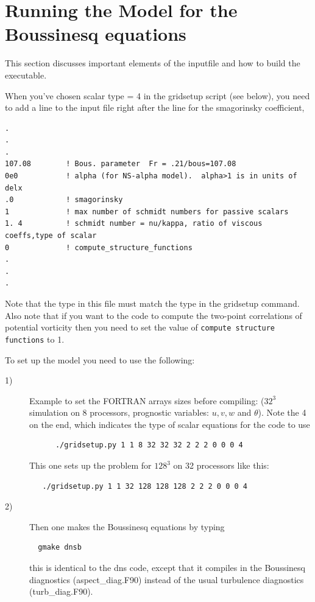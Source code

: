 \documentclass[12pt]{article}
\begin{document}
\section{Running the Model for the Boussinesq equations}

\noindent
This section discusses important elements of the inputfile and how to
build the executable.

When you've chosen scalar type = 4 in the gridsetup script (see
below), you need to add a line to the input file right after the line
for the smagorinsky coefficient,
\noindent
\begin{verbatim}
.
.
.
107.08        ! Bous. parameter  Fr = .21/bous=107.08
0e0           ! alpha (for NS-alpha model).  alpha>1 is in units of delx
.0            ! smagorinsky
1             ! max number of schmidt numbers for passive scalars
1. 4          ! schmidt number = nu/kappa, ratio of viscous coeffs,type of scalar
0             ! compute_structure_functions
.
.
. 
\end{verbatim}


Note that the type in this file must match the type in the gridsetup
command. Also note that if you want to the code to compute the
two-point correlations of potential vorticity then you need to set the
value of \texttt{compute structure functions} to 1.

\noindent
To set up the model you need to use the following:

\begin{description}
  
\item[1)] Example to set the FORTRAN arrays sizes before compiling:
  ($32^3$ simulation on 8 processors, prognostic variables: $u,v,w$
  and $\theta$). Note the 4 on the end, which
  indicates the type of scalar equations for the code to use \\
 
  \begin{verbatim}
      ./gridsetup.py 1 1 8 32 32 32 2 2 2 0 0 0 4
  \end{verbatim}

  \noindent
  This one sets up the problem for $128^3$ on 32 processors
  like this:

  \begin{verbatim}
   ./gridsetup.py 1 1 32 128 128 128 2 2 2 0 0 0 4
  \end{verbatim}

\item[2)] Then one makes the Boussinesq equations by
  typing\\

  \begin{verbatim}
  gmake dnsb
  \end{verbatim}
this  is identical to the dns code, except that it compiles in
the Boussinesq diagnostics (aspect\_diag.F90) 
instead of the usual turbulence
diagnostics (turb\_diag.F90). 
\end{description}
\end{document}
